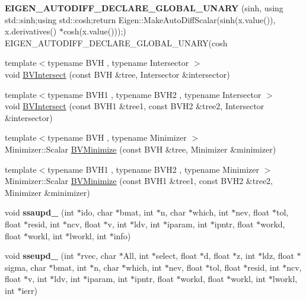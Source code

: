 \begin{DoxyCompactItemize}
\item 
\mbox{\label{namespace_eigen_a77e5dd85fa549b012df73af4865f9b93}} 
{\bfseries E\+I\+G\+E\+N\+\_\+\+A\+U\+T\+O\+D\+I\+F\+F\+\_\+\+D\+E\+C\+L\+A\+R\+E\+\_\+\+G\+L\+O\+B\+A\+L\+\_\+\+U\+N\+A\+RY} (sinh, using std\+::sinh;using std\+::cosh;return Eigen\+::\+Make\+Auto\+Diff\+Scalar(sinh(x.\+value()), x.\+derivatives() $\ast$cosh(x.\+value()));) E\+I\+G\+E\+N\+\_\+\+A\+U\+T\+O\+D\+I\+F\+F\+\_\+\+D\+E\+C\+L\+A\+R\+E\+\_\+\+G\+L\+O\+B\+A\+L\+\_\+\+U\+N\+A\+RY(cosh
\item 
{\footnotesize template$<$typename B\+VH , typename Intersector $>$ }\\void \hyperlink{namespace_eigen_a07d8e283f082c972338f3fc4f644b2a9}{B\+V\+Intersect} (const B\+VH \&tree, Intersector \&intersector)
\item 
{\footnotesize template$<$typename B\+V\+H1 , typename B\+V\+H2 , typename Intersector $>$ }\\void \hyperlink{namespace_eigen_ac3b8047a3ee05b5e6fec4668197a9a43}{B\+V\+Intersect} (const B\+V\+H1 \&tree1, const B\+V\+H2 \&tree2, Intersector \&intersector)
\item 
{\footnotesize template$<$typename B\+VH , typename Minimizer $>$ }\\Minimizer\+::\+Scalar \hyperlink{namespace_eigen_adcbe73ac1482eacab0e18ee32c25508e}{B\+V\+Minimize} (const B\+VH \&tree, Minimizer \&minimizer)
\item 
{\footnotesize template$<$typename B\+V\+H1 , typename B\+V\+H2 , typename Minimizer $>$ }\\Minimizer\+::\+Scalar \hyperlink{namespace_eigen_a915f6adc8b195c94a83c35de6a842556}{B\+V\+Minimize} (const B\+V\+H1 \&tree1, const B\+V\+H2 \&tree2, Minimizer \&minimizer)
\item 
\mbox{\label{namespace_eigen_ac5d064ade25b61d1a15aafd2b0804451}} 
void {\bfseries ssaupd\+\_\+} (int $\ast$ido, char $\ast$bmat, int $\ast$n, char $\ast$which, int $\ast$nev, float $\ast$tol, float $\ast$resid, int $\ast$ncv, float $\ast$v, int $\ast$ldv, int $\ast$iparam, int $\ast$ipntr, float $\ast$workd, float $\ast$workl, int $\ast$lworkl, int $\ast$info)
\item 
\mbox{\label{namespace_eigen_a7b6ec6afef01b98490d99ba2c9d1227a}} 
void {\bfseries sseupd\+\_\+} (int $\ast$rvec, char $\ast$All, int $\ast$select, float $\ast$d, float $\ast$z, int $\ast$ldz, float $\ast$sigma, char $\ast$bmat, int $\ast$n, char $\ast$which, int $\ast$nev, float $\ast$tol, float $\ast$resid, int $\ast$ncv, float $\ast$v, int $\ast$ldv, int $\ast$iparam, int $\ast$ipntr, float $\ast$workd, float $\ast$workl, int $\ast$lworkl, int $\ast$ierr)

\end{DoxyCompactItemize}
